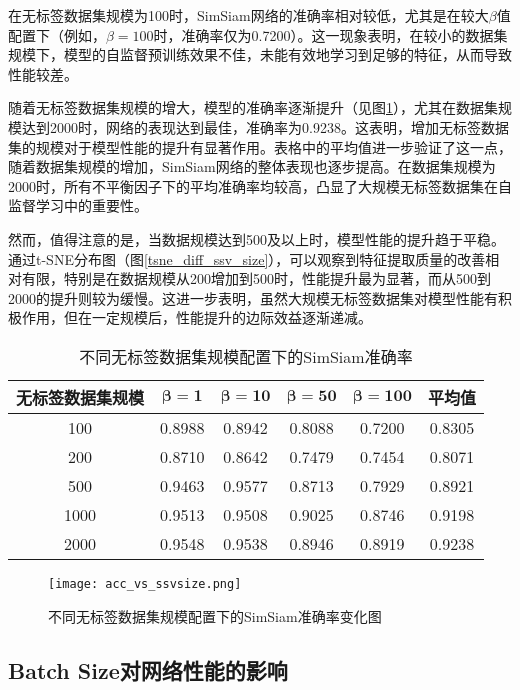 \documentclass[master]{thesis-uestc}
\begin{document}
在无标签数据集规模为100时，SimSiam网络的准确率相对较低，尤其是在较大$\beta$值配置下（例如，$\beta=100$时，准确率仅为0.7200）。这一现象表明，在较小的数据集规模下，模型的自监督预训练效果不佳，未能有效地学习到足够的特征，从而导致性能较差。

随着无标签数据集规模的增大，模型的准确率逐渐提升（见图\ref{acc_vs_ssvsize}），尤其在数据集规模达到2000时，网络的表现达到最佳，准确率为0.9238。这表明，增加无标签数据集的规模对于模型性能的提升有显著作用。表格中的平均值进一步验证了这一点，随着数据集规模的增加，SimSiam网络的整体表现也逐步提高。在数据集规模为2000时，所有不平衡因子下的平均准确率均较高，凸显了大规模无标签数据集在自监督学习中的重要性。

然而，值得注意的是，当数据规模达到500及以上时，模型性能的提升趋于平稳。通过t-SNE分布图（图\ref{tsne_diff_ssv_size}），可以观察到特征提取质量的改善相对有限，特别是在数据规模从200增加到500时，性能提升最为显著，而从500到2000的提升则较为缓慢。这进一步表明，虽然大规模无标签数据集对模型性能有积极作用，但在一定规模后，性能提升的边际效益逐渐递减。

\begin{table}[h]
    \centering
    \caption{不同无标签数据集规模配置下的SimSiam准确率}
    \begin{tabular}{cccccc}
    \toprule
    无标签数据集规模 & $\boldsymbol{\beta=1}$ & $\boldsymbol{\beta=10}$ & $\boldsymbol{\beta=50}$ & $\boldsymbol{\beta=100}$ & \textbf{平均值} \\
    \midrule
    100   & 0.8988 & 0.8942 & 0.8088 & 0.7200 & 0.8305 \\
    200   & 0.8710 & 0.8642 & 0.7479 & 0.7454 & 0.8071 \\
    500   & 0.9463 & 0.9577 & 0.8713 & 0.7929 & 0.8921 \\
    1000  & 0.9513 & 0.9508 & 0.9025 & 0.8746 & 0.9198 \\
    2000  & 0.9548 & 0.9538 & 0.8946 & 0.8919 & 0.9238 \\
    \bottomrule
    \end{tabular}
    \label{tab:fine_tune_acc_ssv_size}
\end{table}
\begin{figure}[h]
    \centering
    \texttt{[image: acc\_vs\_ssvsize.png]}
    \caption{不同无标签数据集规模配置下的SimSiam准确率变化图}
    \label{acc_vs_ssvsize}
\end{figure}


\subsection{Batch Size对网络性能的影响}
\end{document}
